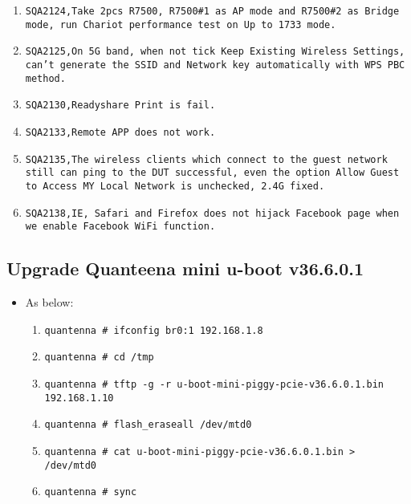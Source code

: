 \documentclass[12pt]{report}
\begin{document}
\begin{itemize}
\begin{enumerate}
		\item \texttt{SQA2124,Take 2pcs R7500, R7500\#1 as AP mode and R7500\#2 as Bridge mode, run Chariot performance test on Up to 1733 mode.}
		\item \texttt{SQA2125,On 5G band, when not tick Keep Existing Wireless Settings, can't generate the SSID and Network key automatically with WPS PBC method.}
		\item \texttt{SQA2130,Readyshare Print is fail.}
		\item \texttt{SQA2133,Remote APP does not work.}
		\item \texttt{SQA2135,The wireless clients which connect to the guest network still can ping to the DUT successful, even the option Allow Guest to Access MY Local Network is unchecked, 2.4G fixed.}
		\item \texttt{SQA2138,IE, Safari and Firefox does not hijack Facebook page when we enable Facebook WiFi function.}
    	\end{enumerate}
    \end{itemize}

    \subsection{Upgrade Quanteena mini u-boot v36.6.0.1}
    \begin{itemize}
    \item As below:
    	\begin{enumerate}
		\item \texttt{quantenna \# ifconfig br0:1 192.168.1.8}
		\item \texttt{quantenna \# cd /tmp}
		\item \texttt{quantenna \# tftp -g -r u-boot-mini-piggy-pcie-v36.6.0.1.bin 192.168.1.10}
		\item \texttt{quantenna \# flash\_eraseall /dev/mtd0}
		\item \texttt{quantenna \# cat u-boot-mini-piggy-pcie-v36.6.0.1.bin > /dev/mtd0}
		\item \texttt{quantenna \# sync}
    	\end{enumerate}
    \end{itemize}
\end{document}
